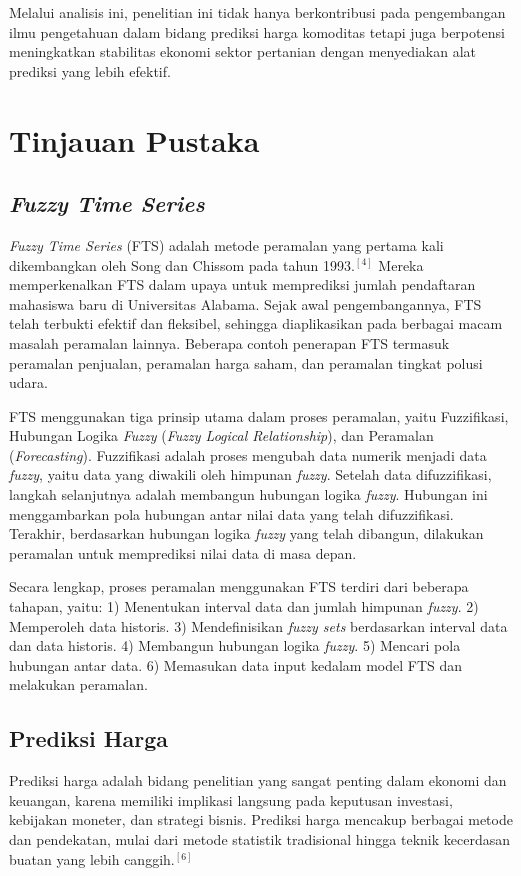 \documentclass[conference]{IEEEtran}
\begin{document}
Melalui analisis ini, penelitian ini tidak hanya berkontribusi pada pengembangan ilmu pengetahuan dalam bidang prediksi harga komoditas tetapi juga berpotensi meningkatkan stabilitas ekonomi sektor pertanian dengan menyediakan alat prediksi yang lebih efektif.


\section{Tinjauan Pustaka}

\subsection{\textit{Fuzzy Time Series}}
\textit{Fuzzy Time Series} (FTS) adalah metode peramalan yang pertama kali dikembangkan oleh Song dan Chissom pada tahun 1993.$^{[4]}$ Mereka memperkenalkan FTS dalam upaya untuk memprediksi jumlah pendaftaran mahasiswa baru di Universitas Alabama. Sejak awal pengembangannya, FTS telah terbukti efektif dan fleksibel, sehingga diaplikasikan pada berbagai macam masalah peramalan lainnya. Beberapa contoh penerapan FTS termasuk peramalan penjualan, peramalan harga saham, dan peramalan tingkat polusi udara.

FTS menggunakan tiga prinsip utama dalam proses peramalan, yaitu Fuzzifikasi, Hubungan Logika \textit{Fuzzy} (\textit{Fuzzy Logical Relationship}), dan Peramalan (\textit{Forecasting}). Fuzzifikasi adalah proses mengubah data numerik menjadi data \textit{fuzzy}, yaitu data yang diwakili oleh himpunan \textit{fuzzy}. Setelah data difuzzifikasi, langkah selanjutnya adalah membangun hubungan logika \textit{fuzzy}. Hubungan ini menggambarkan pola hubungan antar nilai data yang telah difuzzifikasi. Terakhir, berdasarkan hubungan logika \textit{fuzzy} yang telah dibangun, dilakukan peramalan untuk memprediksi nilai data di masa depan.

Secara lengkap, proses peramalan menggunakan FTS terdiri dari beberapa tahapan, yaitu:
    1) Menentukan interval data dan jumlah himpunan \textit{fuzzy}.
    2) Memperoleh data historis.
    3) Mendefinisikan \textit{fuzzy sets} berdasarkan interval data dan data historis.
    4) Membangun hubungan logika \textit{fuzzy}.
    5) Mencari pola hubungan antar data.
    6) Memasukan data input kedalam model FTS dan melakukan peramalan.

\subsection{Prediksi Harga}
Prediksi harga adalah bidang penelitian yang sangat penting dalam ekonomi dan keuangan, karena memiliki implikasi langsung pada keputusan investasi, kebijakan moneter, dan strategi bisnis. Prediksi harga mencakup berbagai metode dan pendekatan, mulai dari metode statistik tradisional hingga teknik kecerdasan buatan yang lebih canggih.$^{[6]}$
\end{document}
